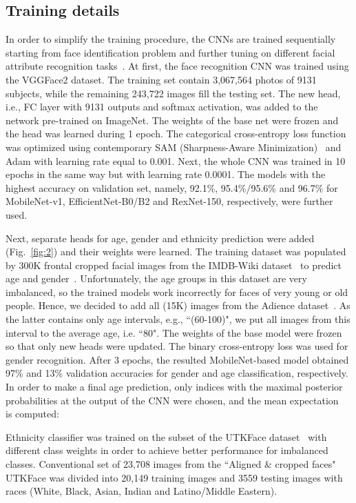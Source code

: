 \documentclass[runningheads]{llncs}
\begin{document}
\subsection{Training details} 
In order to simplify the training procedure, the CNNs are trained sequentially starting from face identification problem and further tuning on different facial attribute recognition tasks~\cite{hung2019increasingly}. At first, the face recognition CNN was trained using the VGGFace2 dataset. The training set contain 3,067,564 photos of 9131 subjects, while the remaining 243,722 images fill the testing set. The new head, i.e., FC layer with 9131 outputs and softmax activation, was added to the network pre-trained on ImageNet. The weights of the base net were frozen and the head was learned during 1 epoch. The categorical cross-entropy loss function was optimized using contemporary SAM (Sharpness-Aware Minimization)~\cite{foret2020sharpness} and Adam with learning rate equal to 0.001. Next, the whole CNN was trained in 10 epochs in the same way but with learning rate 0.0001. The models with the highest accuracy on validation set, namely, 92.1\%, 95.4\%/95.6\% and 96.7\% for MobileNet-v1, EfficientNet-B0/B2 and RexNet-150, respectively, were further used. 

Next, separate heads for age, gender and ethnicity prediction were added (Fig.~\ref{fig:2}) and their weights were learned. The training dataset was populated by 300K frontal cropped facial images from the IMDB-Wiki dataset~\cite{rothe2015dex} to predict age and gender~\cite{savchenko2019peerj}. Unfortunately, the age groups in this dataset are very imbalanced, so the trained models work incorrectly for faces of very young or old people. Hence, we decided to add all (15K) images from the Adience dataset~\cite{eidinger2014age}. As the latter contains only age intervals, e.g., ``(60-100)", we put all images from this interval to the average age, i.e. ``80".
The weights of the base model were frozen so that only new heads were updated. 
The binary cross-entropy loss was used for gender recognition. After 3 epochs, the resulted MobileNet-based model obtained 97\% and 13\% validation accuracies for gender and age classification, respectively. In order to make a final age prediction, only  indices  with the maximal posterior probabilities  at the output of the CNN were chosen, and the mean expectation~\cite{savchenko2019peerj} is computed:



Ethnicity classifier was trained on the subset of the UTKFace dataset~\cite{zhang2017age} with different class weights in order to achieve better performance for imbalanced classes. Conventional set of 23,708 images from the ``Aligned \& cropped faces" UTKFace was divided into 20,149 training images and 3559 testing images with  races (White, Black, Asian, Indian and Latino/Middle Eastern). 
\end{document}
